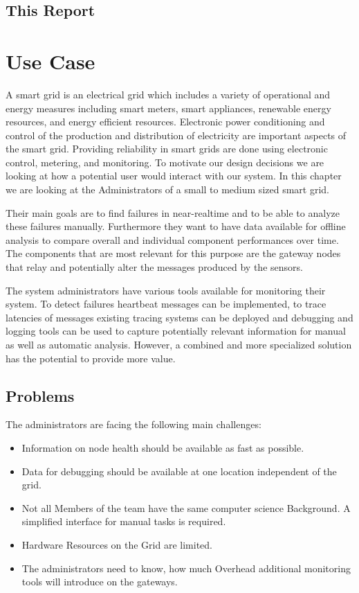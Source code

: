 \subsection{This Report}


\section{Use Case}

A smart grid is an electrical grid which includes a variety of operational and energy measures including smart meters, smart appliances, renewable energy resources, and energy efficient resources.
Electronic power conditioning and control of the production and distribution of electricity are important aspects of the smart grid. 
Providing reliability in smart grids are done using electronic control, metering, and monitoring. 
To motivate our design decisions we are looking at how a potential user would interact with our system. 
In this chapter we are looking at the Administrators of a small to medium sized smart grid. 

Their main goals are to find failures in near-realtime and to be able to analyze these failures manually. 
Furthermore they want to have data available for offline analysis to compare overall and individual component performances over time. 
The components that are most relevant for this purpose are the gateway nodes that relay and potentially alter the messages produced by the sensors.

\vspace{3mm}

The system administrators have various tools available for monitoring their system. 
To detect failures heartbeat messages can be implemented, to trace latencies of messages existing tracing systems can be deployed and debugging and logging tools can be used to capture potentially relevant information for manual as well as automatic analysis.
However, a combined and more specialized solution has the potential to provide more value.

\subsection{Problems}

The administrators are facing the following main challenges:

\begin{itemize}
  \item Information on node health should be available as fast as possible.
  \item Data for debugging should be available at one location independent of the grid.
  \item Not all Members of the team have the same computer science Background. A simplified interface for manual tasks is required.
  \item Hardware Resources on the Grid are limited. 
  \item The administrators need to know, how much Overhead additional monitoring tools will introduce on the gateways.
\end{itemize}

